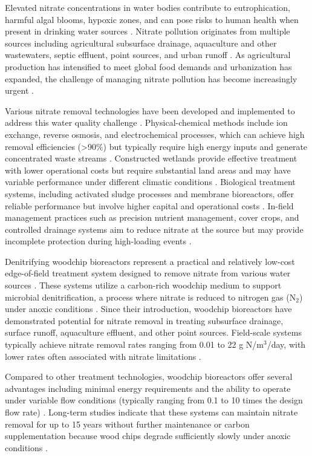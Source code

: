 \documentclass[12pt,a4paper]{article}
\begin{document}
Elevated nitrate concentrations in water bodies contribute to eutrophication, harmful algal blooms, hypoxic zones, and can pose risks to human health when present in drinking water sources \citep{RN1181}. Nitrate pollution originates from multiple sources including agricultural subsurface drainage, aquaculture and other wastewaters, septic effluent, point sources, and urban runoff \citep{RN1181, RN310}. As agricultural production has intensified to meet global food demands and urbanization has expanded, the challenge of managing nitrate pollution has become increasingly urgent \citep{RN312}.

Various nitrate removal technologies have been developed and implemented to address this water quality challenge \citep{RN625, RN826}. Physical-chemical methods include ion exchange, reverse osmosis, and electrochemical processes, which can achieve high removal efficiencies (>90\%) but typically require high energy inputs and generate concentrated waste streams \citep{RN625}. Constructed wetlands provide effective treatment with lower operational costs but require substantial land areas and may have variable performance under different climatic conditions \citep{RN826}. Biological treatment systems, including activated sludge processes and membrane bioreactors, offer reliable performance but involve higher capital and operational costs \citep{RN625}. In-field management practices such as precision nutrient management, cover crops, and controlled drainage systems aim to reduce nitrate at the source but may provide incomplete protection during high-loading events \citep{RN826}.

Denitrifying woodchip bioreactors represent a practical and relatively low-cost edge-of-field treatment system designed to remove nitrate from various water sources \citep{RN625, RN310}. These systems utilize a carbon-rich woodchip medium to support microbial denitrification, a process where nitrate is reduced to nitrogen gas (N$_{2}$) under anoxic conditions \citep{RN242, RN629}. Since their introduction, woodchip bioreactors have demonstrated potential for nitrate removal in treating subsurface drainage, surface runoff, aquaculture effluent, and other point sources. Field-scale systems typically achieve nitrate removal rates ranging from 0.01 to 22 g N/m$^3$/day, with lower rates often associated with nitrate limitations \citep{RN625, RN310}.

Compared to other treatment technologies, woodchip bioreactors offer several advantages including minimal energy requirements and the ability to operate under variable flow conditions (typically ranging from 0.1 to 10 times the design flow rate) \citep{RN625, RN310}. Long-term studies indicate that these systems can maintain nitrate removal for up to 15 years without further maintenance or carbon supplementation because wood chips degrade sufficiently slowly under anoxic conditions \citep{RN625, RN629}.
\end{document}
